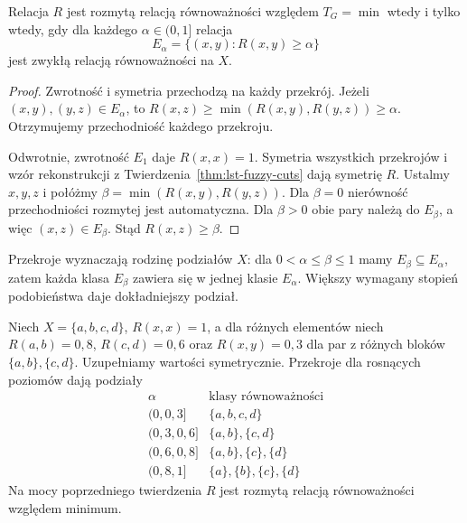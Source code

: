 \begin{twierdzenie}
\label{thm:lst-fuzzy-equivalence-cuts}
Relacja $R$ jest rozmytą relacją równoważności względem
$T_G=\min$ wtedy i tylko wtedy, gdy dla każdego
$\alpha\in(0,1]$ relacja
\[
 E_\alpha=\{(x,y):R(x,y)\geq\alpha\}
\]
jest zwykłą relacją równoważności na $X$.
\end{twierdzenie}
\begin{proof}
Zwrotność i symetria przechodzą na każdy przekrój.
Jeżeli $(x,y),(y,z)\in E_\alpha$, to
$R(x,z)\geq\min(R(x,y),R(y,z))\geq\alpha$.
Otrzymujemy przechodniość każdego przekroju.

Odwrotnie, zwrotność $E_1$ daje $R(x,x)=1$.
Symetria wszystkich przekrojów i wzór rekonstrukcji
z Twierdzenia~\ref{thm:lst-fuzzy-cuts} dają symetrię $R$.
Ustalmy $x,y,z$ i połóżmy
$\beta=\min(R(x,y),R(y,z))$. Dla $\beta=0$ nierówność
przechodniości rozmytej jest automatyczna. Dla $\beta>0$
obie pary należą do $E_\beta$, a więc $(x,z)\in E_\beta$.
Stąd $R(x,z)\geq\beta$.
\end{proof}

Przekroje wyznaczają rodzinę podziałów $X$:
dla $0<\alpha\leq\beta\leq1$ mamy $E_\beta\subseteq E_\alpha$,
zatem każda klasa $E_\beta$ zawiera się w jednej klasie
$E_\alpha$. Większy wymagany stopień podobieństwa daje
dokładniejszy podział.

\begin{przyklad}\label{ex:lst-fuzzy-partitions}
Niech $X=\{a,b,c,d\}$, $R(x,x)=1$, a dla różnych elementów
niech $R(a,b)=0{,}8$, $R(c,d)=0{,}6$ oraz
$R(x,y)=0{,}3$ dla par z różnych bloków
$\{a,b\},\{c,d\}$. Uzupełniamy wartości symetrycznie.
Przekroje dla rosnących poziomów dają podziały
\[
\begin{array}{c|l}
 \alpha & \text{klasy równoważności}\\ \hline
 (0,0{,}3] & \{a,b,c,d\}\\
 (0{,}3,0{,}6] & \{a,b\},\{c,d\}\\
 (0{,}6,0{,}8] & \{a,b\},\{c\},\{d\}\\
 (0{,}8,1] & \{a\},\{b\},\{c\},\{d\}
\end{array}
\]
Na mocy poprzedniego twierdzenia $R$ jest rozmytą relacją
równoważności względem minimum.
\begin{center}
\end{center}
\end{przyklad}

